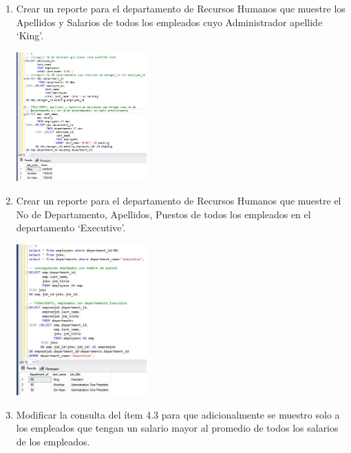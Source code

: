 \begin{enumerate}[1.]
	\item Crear un reporte para el departamento de Recursos Humanos que muestre los Apellidos y Salarios de todos los empleados cuyo Administrador apellide ‘King’.

\begin{itemize}
	\begin{center}
	\includegraphics[width=5cm]{./Imagenes/actividad0906} 
	\end{center}
\end{itemize}

	\item Crear un reporte para el departamento de Recursos Humanos que muestre el No de Departamento, Apellidos, Puestos de todos los empleados en el departamento ‘Executive’.

\begin{itemize}
	\begin{center}
	\includegraphics[width=5cm]{./Imagenes/actividad0907} 
	\end{center}
\end{itemize}

	\item Modificar la consulta del ítem 4.3 para que adicionalmente se muestro solo a los empleados que tengan un salario mayor al promedio de todos los salarios de los empleados.
\end{enumerate}
